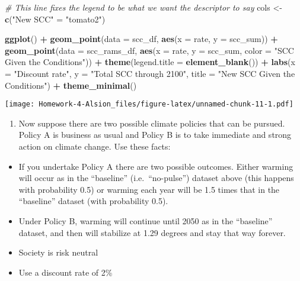 \documentclass[
]{article}
\newenvironment{Shaded}{\begin{snugshade}}{\end{snugshade}}
\newcommand{\CommentTok}[1]{\textcolor[rgb]{0.56,0.35,0.01}{\textit{#1}}}
\newcommand{\DataTypeTok}[1]{\textcolor[rgb]{0.13,0.29,0.53}{#1}}
\newcommand{\KeywordTok}[1]{\textcolor[rgb]{0.13,0.29,0.53}{\textbf{#1}}}
\newcommand{\NormalTok}[1]{#1}
\newcommand{\OperatorTok}[1]{\textcolor[rgb]{0.81,0.36,0.00}{\textbf{#1}}}
\newcommand{\StringTok}[1]{\textcolor[rgb]{0.31,0.60,0.02}{#1}}
\providecommand{\tightlist}{%
  \setlength{\itemsep}{0pt}\setlength{\parskip}{0pt}}
\begin{document}
\begin{Shaded}
\begin{Highlighting}[]
\CommentTok{# This line fixes the legend to be what we want the descriptor to say}
\NormalTok{cols <-}\StringTok{ }\KeywordTok{c}\NormalTok{(}\StringTok{"New SCC"}\NormalTok{ =}\StringTok{ "tomato2"}\NormalTok{)}

\KeywordTok{ggplot}\NormalTok{() }\OperatorTok{+}
\StringTok{  }\KeywordTok{geom_point}\NormalTok{(}\DataTypeTok{data =}\NormalTok{ scc_df,}
             \KeywordTok{aes}\NormalTok{(}\DataTypeTok{x =}\NormalTok{ rate, }\DataTypeTok{y =}\NormalTok{ scc_sum)) }\OperatorTok{+}
\StringTok{  }\KeywordTok{geom_point}\NormalTok{(}\DataTypeTok{data =}\NormalTok{ scc_rams_df, }\KeywordTok{aes}\NormalTok{(}\DataTypeTok{x =}\NormalTok{ rate, }\DataTypeTok{y =}\NormalTok{ scc_sum, }\DataTypeTok{color =} \StringTok{"SCC Given the Conditions"}\NormalTok{)) }\OperatorTok{+}
\StringTok{  }\KeywordTok{theme}\NormalTok{(}\DataTypeTok{legend.title =} \KeywordTok{element_blank}\NormalTok{()) }\OperatorTok{+}
\StringTok{  }\KeywordTok{labs}\NormalTok{(}\DataTypeTok{x =} \StringTok{"Discount rate"}\NormalTok{, }\DataTypeTok{y =} \StringTok{"Total SCC through 2100"}\NormalTok{, }\DataTypeTok{title =} \StringTok{"New SCC Given the Conditions"}\NormalTok{) }\OperatorTok{+}
\StringTok{  }\KeywordTok{theme_minimal}\NormalTok{()}
\end{Highlighting}
\end{Shaded}

\texttt{[image: Homework-4-Alsion\_files/figure-latex/unnamed-chunk-11-1.pdf]}

\begin{enumerate}
\def\labelenumi{\arabic{enumi}.}
\setcounter{enumi}{4}
\tightlist
\item
  Now suppose there are two possible climate policies that can be
  pursued. Policy A is business as usual and Policy B is to take
  immediate and strong action on climate change. Use these facts:
\end{enumerate}

\begin{itemize}
\tightlist
\item
  If you undertake Policy A there are two possible outcomes. Either
  warming will occur as in the ``baseline'' (i.e.~``no-pulse'') dataset
  above (this happens with probability 0.5) or warming each year will be
  1.5 times that in the ``baseline'' dataset (with probability 0.5).
\item
  Under Policy B, warming will continue until 2050 as in the
  ``baseline'' dataset, and then will stabilize at 1.29 degrees and stay
  that way forever.
\item
  Society is risk neutral
\item
  Use a discount rate of 2\%
\end{itemize}
\end{document}
